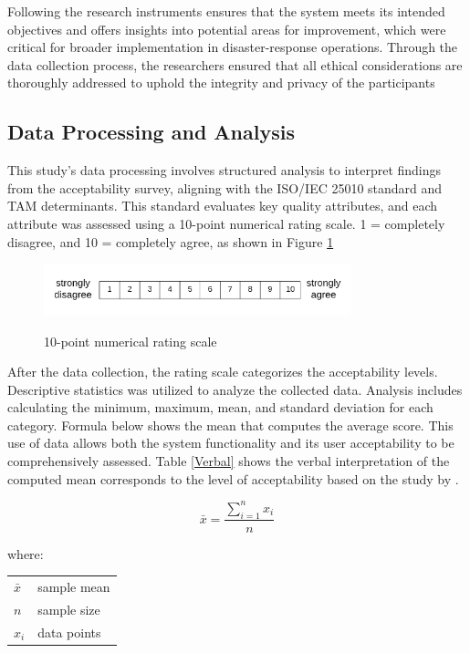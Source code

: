 	Following the research instruments ensures that the system meets its intended objectives and offers insights into potential areas for improvement, which were critical for broader implementation in disaster-response operations. Through the data collection process, the researchers ensured that all ethical considerations are thoroughly addressed to uphold the integrity and privacy of the participants

\subsection{Data Processing and Analysis}
	This study's data processing involves structured analysis to interpret findings from the acceptability survey, aligning with the ISO/IEC 25010 standard and TAM determinants. This standard evaluates key quality attributes, and each attribute was assessed using a 10-point numerical rating scale. 1 = completely disagree, and 10 = completely agree, as shown in Figure \ref{Nrs}
	
	\begin{figure}[h!]
		\caption{10-point numerical rating scale}
		\centering
		\includegraphics[width=3.5in]{Nrs-10}
		\label{Nrs}
	\end{figure}
	
	After the data collection, the rating scale categorizes the acceptability levels. Descriptive statistics was utilized to analyze the collected data. Analysis includes calculating the minimum, maximum, mean, and standard deviation for each category. Formula below shows the mean that computes the average score. This use of data allows both the system functionality and its user acceptability to be comprehensively assessed. Table \ref{Verbal} shows the verbal interpretation of the computed mean corresponds to the level of acceptability based on the study by \textcite{Eladia2024}. 
	
	
	\begin{equation} 
		\label{mean}
		\bar{x} = \frac{\sum_{i=1}^{n} x_{i}}{n}
	\end{equation}
	
	\noindent where: \\
	\begin{tabular}{@{}ll}
	$\bar{x}$ & sample mean \\
	$n$ & sample size \\
	$x_{i}$ & data points \\
	\end{tabular}
	
